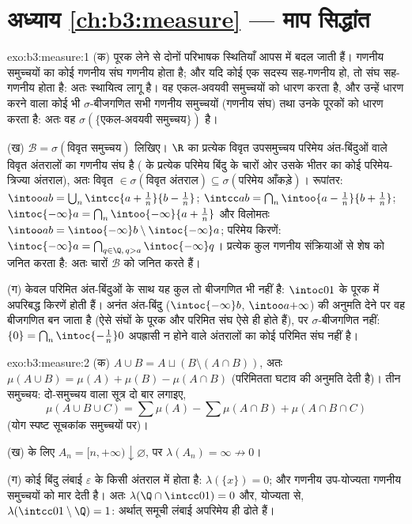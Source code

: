 \section*{अध्याय \ref{ch:b3:measure} --- माप सिद्धांत}

\begin{solution}{exo:b3:measure:1}
(क) पूरक लेने से दोनों परिभाषक स्थितियाँ आपस में बदल जाती हैं।
गणनीय समुच्चयों का कोई गणनीय संघ गणनीय होता है; और यदि कोई एक सदस्य
सह-गणनीय हो, तो संघ सह-गणनीय होता है: अतः स्थायित्व लागू है। वह
एकल-अवयवी समुच्चयों को धारण करता है, और उन्हें धारण करने वाला कोई
भी $\sigma$-बीजगणित सभी गणनीय समुच्चयों (गणनीय संघ) तथा उनके पूरकों को
धारण करता है: अतः वह $\sigma(\{\text{एकल-अवयवी समुच्चय}\})$ है।

(ख) $\mathcal B = \sigma(\text{विवृत समुच्चय})$ लिखिए। $\R$ का प्रत्येक विवृत उपसमुच्चय परिमेय अंत-बिंदुओं
वाले विवृत अंतरालों का गणनीय संघ है ( के प्रत्येक
परिमेय बिंदु के चारों ओर उसके भीतर का कोई परिमेय-त्रिज्या अंतराल),
अतः विवृत $\in
\sigma(\text{विवृत अंतराल}) \subseteq \sigma(\text{परिमेय
आँकड़े})$। रूपांतर: $\intoo ab = \bigcup_n\intcc{a +
\frac1n}{b - \frac1n}$; $\intcc ab = \bigcap_n \intoo{a -
\frac1n}{b + \frac1n}$; $\intoc{-\infty}a = \bigcap_n
\intoo{-\infty}{a + \frac1n}$ और विलोमतः $\intoo ab =
\intoo{-\infty}b \setminus \intoc{-\infty}a$; परिमेय किरणें:
$\intoc{-\infty}a =
\bigcap_{q \in \Q,\, q > a}\intoc{-\infty}q$। प्रत्येक कुल गणनीय संक्रियाओं से शेष को जनित करता है: अतः
चारों $\mathcal B$ को जनित करते हैं।

(ग) केवल परिमित अंत-बिंदुओं के साथ यह कुल तो बीजगणित भी नहीं है:
$\intoc01$ के पूरक में अपरिबद्ध किरणें होती हैं। अनंत अंत-बिंदु ($\intoc{-\infty}b$,
$\intoo
a{+\infty}$) की अनुमति देने पर वह बीजगणित बन जाता है (ऐसे संघों के पूरक
और परिमित संघ ऐसे ही होते हैं), पर $\sigma$-बीजगणित नहीं: $\{0\} = \bigcap_n\intoc{-\frac1n}0$ अपह्रासी
न होने वाले अंतरालों का कोई परिमित संघ नहीं है।
\end{solution}

\begin{solution}{exo:b3:measure:2}
(क) $A \cup B = A \sqcup (B \setminus (A\cap B))$, अतः $\mu(A\cup B) = \mu(A) + \mu(B) - \mu(A\cap B)$ (परिमितता घटाव की अनुमति देती है)। तीन समुच्चय:
दो-समुच्चय वाला सूत्र दो बार लगाइए,
\[
\mu(A\cup B\cup C) = \sum\mu(A) - \sum\mu(A\cap B) +
\mu(A\cap B\cap C)
\]
(योग स्पष्ट सूचकांक समुच्चयों पर)।

(ख)  के लिए $A_n = [n, +\infty) \downarrow
\varnothing$, पर $\lambda(A_n) = \infty \not\to 0$।

(ग) कोई बिंदु लंबाई $\varepsilon$ के किसी अंतराल में होता है: $\lambda(\{x\}) = 0$; और गणनीय
उप-योज्यता गणनीय समुच्चयों को मार देती है। अतः $\lambda(\Q \cap \intcc01) = 0$ और, योज्यता से,
$\lambda(\intcc01\setminus\Q) = 1$: अर्थात् समूची लंबाई अपरिमेय ही ढोते हैं।
\end{solution}

